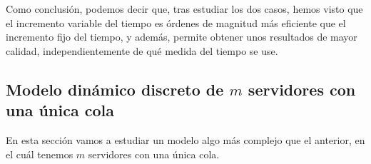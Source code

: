 \documentclass[11pt,a4paper]{article}
\begin{document}
Como conclusión, podemos decir que, tras estudiar los dos casos, hemos visto
que el incremento variable del tiempo es órdenes de magnitud más eficiente
que el incremento fijo del tiempo, y además, permite obtener unos resultados
de mayor calidad, independientemente de qué medida del tiempo se use.

\subsection{Modelo dinámico discreto de $m$ servidores con una única cola}

En esta sección vamos a estudiar un modelo algo más complejo que el anterior,
en el cuál tenemos $m$ servidores con una única cola.
\end{document}
